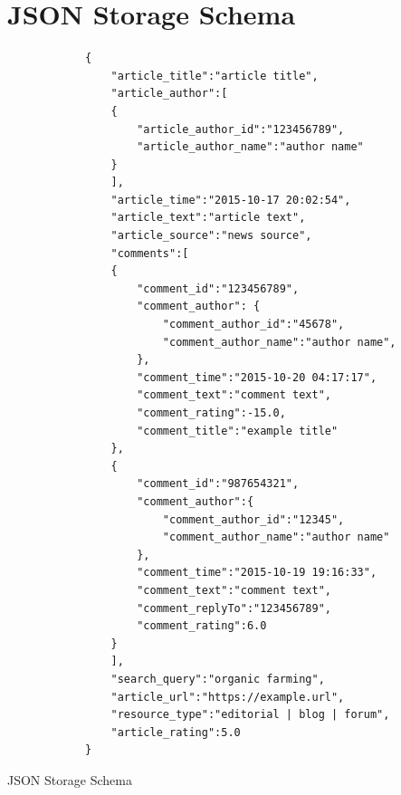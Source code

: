 \section{JSON Storage Schema}
\label{sec:appendix:json}
\begin{center}
	\begin{listing}
		\begin{verbatim}
			{
				"article_title":"article title",
				"article_author":[
				{
					"article_author_id":"123456789",
					"article_author_name":"author name"
				}
				],
				"article_time":"2015-10-17 20:02:54",
				"article_text":"article text",
				"article_source":"news source",
				"comments":[
				{
					"comment_id":"123456789",
					"comment_author": {
						"comment_author_id":"45678",
						"comment_author_name":"author name",
					},
					"comment_time":"2015-10-20 04:17:17",
					"comment_text":"comment text",
					"comment_rating":-15.0,
					"comment_title":"example title"
				},
				{
					"comment_id":"987654321",
					"comment_author":{
						"comment_author_id":"12345",
						"comment_author_name":"author name"
					},
					"comment_time":"2015-10-19 19:16:33",
					"comment_text":"comment text",
					"comment_replyTo":"123456789",
					"comment_rating":6.0
				}
				],
				"search_query":"organic farming",
				"article_url":"https://example.url",
				"resource_type":"editorial | blog | forum",
				"article_rating":5.0
			}
		\end{verbatim}
		\caption{JSON Storage Schema}
		\label{jsonschema}
	\end{listing}
\end{center}
